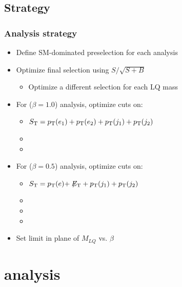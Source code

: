 \documentclass[bigger]{beamer}
\begin{document}
\subsection{Strategy}
\label{sec-1-2}
\begin{frame}
\frametitle{Analysis strategy}
\label{sec-1-2-1}

\begin{itemize}
\item Define SM-dominated preselection for each analysis
\item Optimize final selection using $S/\sqrt{S+B}$
\begin{itemize}
\item Optimize a different selection for each LQ mass
\end{itemize}
\item For \eejj ($\beta = 1.0$) analysis, optimize cuts on:
\begin{itemize}
\item $S_{\text{T}} = p_{\text{T}}(e_1) + p_{\text{T}}(e_2) + p_{\text{T}}(j_1) + p_{\text{T}}(j_2)$
\item \mejmin
\item \mee
\end{itemize}
\item For \enujj ($\beta = 0.5$) analysis, optimize cuts on:
\begin{itemize}
\item $S_{\text{T}} = p_{\text{T}}(e) + \not\!\!{E_{\text{T}}} + p_{\text{T}}(j_1) + p_{\text{T}}(j_2)$
\item \mej
\item \mt
\item \met
\end{itemize}
\item Set limit in plane of $M_{LQ}$ vs. $\beta$
\end{itemize}
\end{frame}
\section{\eejj analysis}
\label{sec-2}
\end{document}
